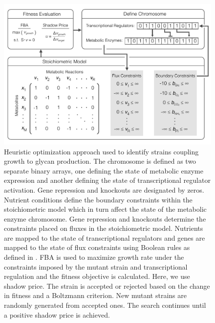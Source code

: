 \documentclass[12pt]{article}
\begin{document}

\clearpage

\begin{figure}\centering
\includegraphics[width=\textwidth]{./figures/fig2-workflow.pdf}
\caption{Heuristic optimization approach used to identify strains coupling growth to glycan production. The chromosome is defined as two separate binary arrays, one defining the state of metabolic enzyme expression and another defining the state of transcriptional regulator activation. Gene repression and knockouts are designated by zeros. Nutrient conditions define the boundary constraints within the stoichiometric model which in turn affect the state of the metabolic enzyme chromosome. Gene repression and knockouts determine the constraints placed on fluxes in the stoichiometric model. Nutrients are mapped to the state of transcriptional regulators and genes are mapped to the state of flux constraints using Boolean rules as defined in \cite{2004-covert-reed-herrgard-palsson-Nat,2007-feist-reed-hatzimanikatis-palsson-MolSysBio}. FBA is used to maximize growth rate under the constraints imposed by the mutant strain and transcriptional regulation and the fitness objective is calculated. Here, we use shadow price. The strain is accepted or rejected based on the change in fitness and a Boltzmann criterion. New mutant strains are randomly generated from accepted ones. The search continues until a positive shadow price is achieved.}
\label{fig-workflow-heuristic}
\end{figure}


\clearpage
\end{document}
